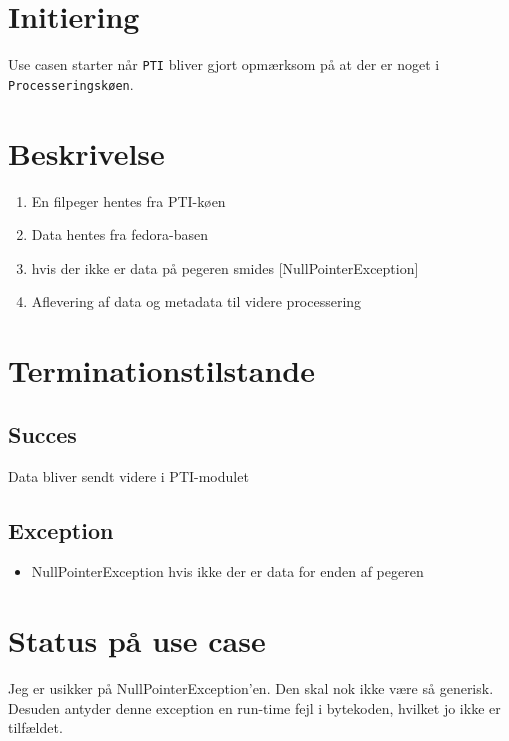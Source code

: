 \documentclass{article}
\begin{document}
\section{Initiering}
Use casen starter når \texttt{PTI} bliver gjort
opmærksom på at der er noget i \texttt{Processeringskøen}.

\section{Beskrivelse}
\begin{enumerate}
\item En filpeger hentes fra PTI-køen
\item Data hentes fra fedora-basen
\item hvis der ikke er data på pegeren smides [NullPointerException]
\item Aflevering af data og metadata til videre processering
\end{enumerate}


\section{Terminationstilstande}

\subsection{Succes}
Data bliver sendt videre i PTI-modulet

\subsection{Exception}
\begin{itemize}
\item NullPointerException hvis ikke der er data for enden af pegeren
\end{itemize}

\section{Status på use case}
Jeg er usikker på NullPointerException'en. Den skal nok ikke være så
generisk. Desuden antyder denne exception en run-time fejl i
bytekoden, hvilket jo ikke er tilfældet.
\end{document}
